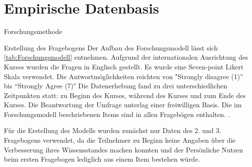 \section{Empirische Datenbasis}
\label{sec:emp_daten}

Forschungsmethode

Erstellung des Fragebogens
Der Aufbau des Forschungsmodell lässt sich \ref{tab:Forschungsmodell} entnehmen. Aufgrund der internationalen Ausrichtung des Kurses wurden die Fragen in Englisch gestellt. 
Es wurde eine Seven-point Likert Skala verwendet. Die Antwortmöglichkeiten reichten von "Strongly disagree (1)” bis “Strongly Agree (7)"  
Die Datenerhebung fand zu drei unterschiedlichen Zeitpunkten statt: zu Beginn des Kurses, während des Kurses und zum Ende des Kurses. Die Beantwortung der Umfrage unterlag einer freiwilligen Basis. Die im Forschungsmodell beschriebenen Items sind in allen Fragebögen enthalten. .

Für die Erstellung des Modells wurden zunächst nur Daten des 2. und 3. Fragebogens verwendet, da die Teilnehmer zu Beginn keine Angaben über die Verbesserung ihres Wissensstandes machen konnten und der Persönliche Nutzen beim ersten Fragebogen lediglich aus einem Item bestehen würde. 
 

